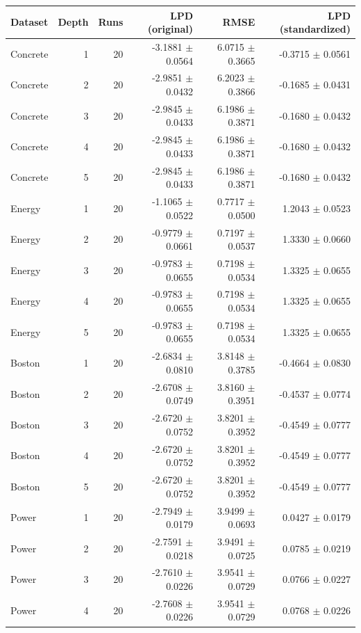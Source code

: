 \begin{tabular}{lrrrrr}
\toprule
Dataset & Depth & Runs & LPD (original) & RMSE & LPD (standardized) \\
\midrule
Concrete & 1 & 20 & -3.1881 $\pm$ 0.0564 & 6.0715 $\pm$ 0.3665 & -0.3715 $\pm$ 0.0561 \\
Concrete & 2 & 20 & -2.9851 $\pm$ 0.0432 & 6.2023 $\pm$ 0.3866 & -0.1685 $\pm$ 0.0431 \\
Concrete & 3 & 20 & -2.9845 $\pm$ 0.0433 & 6.1986 $\pm$ 0.3871 & -0.1680 $\pm$ 0.0432 \\
Concrete & 4 & 20 & -2.9845 $\pm$ 0.0433 & 6.1986 $\pm$ 0.3871 & -0.1680 $\pm$ 0.0432 \\
Concrete & 5 & 20 & -2.9845 $\pm$ 0.0433 & 6.1986 $\pm$ 0.3871 & -0.1680 $\pm$ 0.0432 \\
Energy & 1 & 20 & -1.1065 $\pm$ 0.0522 & 0.7717 $\pm$ 0.0500 & 1.2043 $\pm$ 0.0523 \\
Energy & 2 & 20 & -0.9779 $\pm$ 0.0661 & 0.7197 $\pm$ 0.0537 & 1.3330 $\pm$ 0.0660 \\
Energy & 3 & 20 & -0.9783 $\pm$ 0.0655 & 0.7198 $\pm$ 0.0534 & 1.3325 $\pm$ 0.0655 \\
Energy & 4 & 20 & -0.9783 $\pm$ 0.0655 & 0.7198 $\pm$ 0.0534 & 1.3325 $\pm$ 0.0655 \\
Energy & 5 & 20 & -0.9783 $\pm$ 0.0655 & 0.7198 $\pm$ 0.0534 & 1.3325 $\pm$ 0.0655 \\
Boston & 1 & 20 & -2.6834 $\pm$ 0.0810 & 3.8148 $\pm$ 0.3785 & -0.4664 $\pm$ 0.0830 \\
Boston & 2 & 20 & -2.6708 $\pm$ 0.0749 & 3.8160 $\pm$ 0.3951 & -0.4537 $\pm$ 0.0774 \\
Boston & 3 & 20 & -2.6720 $\pm$ 0.0752 & 3.8201 $\pm$ 0.3952 & -0.4549 $\pm$ 0.0777 \\
Boston & 4 & 20 & -2.6720 $\pm$ 0.0752 & 3.8201 $\pm$ 0.3952 & -0.4549 $\pm$ 0.0777 \\
Boston & 5 & 20 & -2.6720 $\pm$ 0.0752 & 3.8201 $\pm$ 0.3952 & -0.4549 $\pm$ 0.0777 \\
Power & 1 & 20 & -2.7949 $\pm$ 0.0179 & 3.9499 $\pm$ 0.0693 & 0.0427 $\pm$ 0.0179 \\
Power & 2 & 20 & -2.7591 $\pm$ 0.0218 & 3.9491 $\pm$ 0.0725 & 0.0785 $\pm$ 0.0219 \\
Power & 3 & 20 & -2.7610 $\pm$ 0.0226 & 3.9541 $\pm$ 0.0729 & 0.0766 $\pm$ 0.0227 \\
Power & 4 & 20 & -2.7608 $\pm$ 0.0226 & 3.9541 $\pm$ 0.0729 & 0.0768 $\pm$ 0.0226 \\

\end{tabular}
